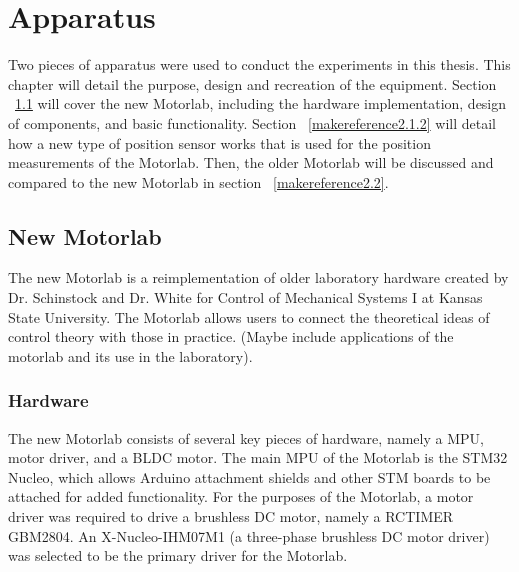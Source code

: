 
\cleardoublepage


\chapter{Apparatus}
\label{makereference2}

Two pieces of apparatus were used to conduct the experiments in this thesis. This chapter will detail the purpose, design and recreation of the equipment. Section ~\ref{makereference2.1} will cover the new Motorlab, including the hardware implementation, design of components, and basic functionality. Section ~\ref{makereference2.1.2} will detail how a new type of position sensor works that is used for the position measurements of the Motorlab. Then, the older Motorlab will be discussed and compared to the new Motorlab in section ~\ref{makereference2.2}.

\section{New Motorlab}
\label{makereference2.1} 

The new Motorlab is a reimplementation of older laboratory hardware created by Dr. Schinstock and Dr. White for Control of Mechanical Systems I at Kansas State University. The Motorlab allows users to connect the theoretical ideas of control theory with those in practice. (Maybe include applications of the motorlab and its use in the laboratory).

\subsection{Hardware}
\label{makereference2.1.1} 

The new Motorlab consists of several key pieces of hardware, namely a \ac{MPU}, motor driver, and a \ac{BLDC} motor. The main MPU of the Motorlab is the STM32 Nucleo, which allows Arduino attachment shields and other STM boards to be attached for added functionality. For the purposes of the Motorlab, a motor driver was required to drive a brushless DC motor, namely a RCTIMER GBM2804. An X-Nucleo-IHM07M1 (a three-phase brushless DC motor driver) was selected to be the primary driver for the Motorlab.

